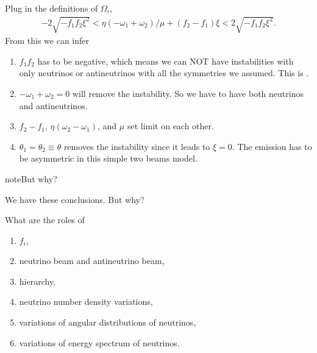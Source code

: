 \documentclass[letterpaper,12pt,english]{sphinxmanual}
\begin{document}
Plug in the definitions of \(\Omega_i\),
\begin{equation*}
\begin{split}-2\sqrt{-f_1f_2\xi^2}< \eta(- \omega_1 + \omega_2)/\mu + (f_2 - f_1)\xi < 2\sqrt{-f_1f_2\xi^2}.\end{split}
\end{equation*}
From this we can infer
\begin{enumerate}
\item {} 
\(f_1f_2\) has to be negative, which means we can NOT have instabilities with only neutrinos or antineutrinos with all the symmetries we assumed. This is .

\item {} 
\(-\omega_1+\omega_2=0\) will remove the instability. So we have to have both neutrinos and antineutrinos.

\item {} 
\(f_2-f_1\), \(\eta(\omega_2-\omega_1)\), and \(\mu\) set limit on each other.

\item {} 
\(\theta_1=\theta_2\equiv \theta\) removes the instability since it leads to \(\xi=0\). The emission has to be asymmetric in this simple two beams model. 

\end{enumerate}

\begin{sphinxadmonition}{note}{But why?}

We have these conclusions. But why?

What are the roles of
\begin{enumerate}
\item {} 
\(f_i\),

\item {} 
neutrino beam and antineutrino beam,

\item {} 
hierarchy,

\item {} 
neutrino number density variations,

\item {} 
variations of angular distributions of neutrinos,

\item {} 
variations of energy spectrum of neutrinos.

\end{enumerate}
\end{sphinxadmonition}
\end{document}
